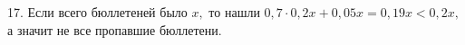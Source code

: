 17. Если всего бюллетеней было $x,$ то нашли $0,7\cdot0,2x+0,05x=0,19x<0,2x,$ а значит не все пропавшие бюллетени.\\
